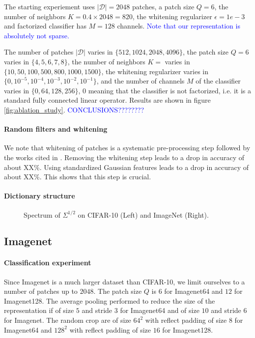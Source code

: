 \documentclass{article}
\newcommand{\Edouard}[1]{\textcolor{blue}{#1}}
\begin{document}
The starting experiement uses  $|\mathcal{D}|=2048$ patches, a patch size $Q=6$, the number of neighbors $K=0.4\times 2048 = 820$, the whitening regularizer $\epsilon=1e-3$ and factorized classifier has $M=128$ channels. \Edouard{Note that our representation is absolutely not sparse.}


The number of patches $|\mathcal{D}|$ varies in $\lbrace 512, 1024, 2048, 4096 \rbrace$, the patch size $Q=6$ varies in $\lbrace 4, 5, 6, 7, 8 \rbrace$, the number of neighbors $K=$ varies in $\lbrace 10, 50, 100, 500, 800, 1000, 1500 \rbrace$, the whitening regularizer varies in $\lbrace0, 10^{-5}, 10^{-4}, 10^{-3}, 10^{-2}, 10^{-1}\rbrace$, and the number of channels $M$ of the classifier varies in $\lbrace 0, 64, 128 ,256 \rbrace$, $0$ meaning that the classifier is not factorized, i.e. it is a standard fully connected linear operator.
Results are shown in figure \ref{fig:ablation_study}. \Edouard{CONCLUSIONS????????}

\paragraph{Random filters and whitening} We note that whitening of patches is a systematic pre-processing step followed by the works cited in \cite{}. Removing the whitening step leads to a drop in accuracy of about XX\%. Using standardized Gaussian features leads to a drop in accuracy of about XX\%. This shows that this step is crucial.

\paragraph{Dictionary structure}


\begin{figure}
  \centering
  \fbox{\rule[-.5cm]{0cm}{4cm} \rule[-.5cm]{4cm}{0cm}}
  \caption{Spectrum of $\Sigma^{1/2}$ on CIFAR-10 (Left) and ImageNet (Right).\label{dico}}
\end{figure}
\subsection{Imagenet}

\paragraph{Classification experiment} Since Imagenet is a much larger dataset than CIFAR-10, we limit ourselves to a number of patches up to $2048$.
The patch size $Q$ is $6$ for Imagenet64 and $12$ for Imagenet128.
The average pooling performed to reduce the size of the representation if of size $5$ and stride $3$ for Imagenet64 and of size $10$ and stride $6$ for Imagenet.
The random crop are of size $64^2$ with reflect padding of size $8$ for Imagenet64 and  $128^2$ with reflect padding of size $16$ for Imagenet128.
\end{document}
